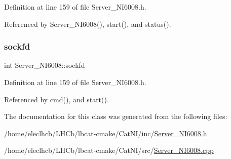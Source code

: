Definition at line 159 of file Server\+\_\+\+N\+I6008.\+h.



Referenced by Server\+\_\+\+N\+I6008(), start(), and status().

\mbox{\label{classServer__NI6008_a79b2fe632095d34e1c6320a1ffe2d561}} 
\subsubsection{\texorpdfstring{sockfd}{sockfd}}
{\footnotesize\ttfamily int Server\+\_\+\+N\+I6008\+::sockfd\hspace{0.3cm}{\ttfamily [private]}}



Definition at line 159 of file Server\+\_\+\+N\+I6008.\+h.



Referenced by cmd(), and start().



The documentation for this class was generated from the following files\+:\begin{DoxyCompactItemize}
\item 
/home/eleclhcb/\+L\+H\+Cb/lbcat-\/cmake/\+Cat\+N\+I/inc/\hyperlink{Server__NI6008_8h}{Server\+\_\+\+N\+I6008.\+h}\item 
/home/eleclhcb/\+L\+H\+Cb/lbcat-\/cmake/\+Cat\+N\+I/src/\hyperlink{Server__NI6008_8cpp}{Server\+\_\+\+N\+I6008.\+cpp}\end{DoxyCompactItemize}
